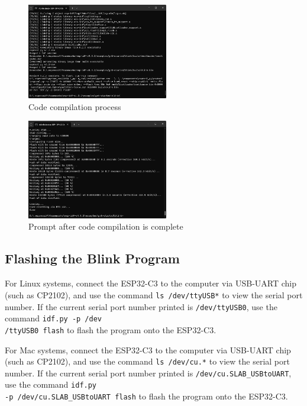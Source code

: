 \documentclass[a4paper,12pt,openany]{book}
\begin{document}
\begin{figure}[h!]
    \Centering
    \includegraphics[width=0.55\textwidth]{D4Z/4-20}
    \caption{Code compilation process}
    \label{Code compilation process}
\end{figure}

\begin{figure}[h!]
    \Centering
    \includegraphics[width=0.55\textwidth]{D4Z/4-21}
    \caption{Prompt after code compilation is complete}
    \label{Prompt after code compilation is complete}
\end{figure}

\subsection{Flashing the Blink Program}
For Linux systems, connect the ESP32-C3 to the computer via USB-UART chip (such as CP2102), and use the command \verb|ls /dev/ttyUSB*| to view the serial port number. If the current serial port number printed is \verb|/dev/ttyUSB0|, use the command \verb|idf.py -p /dev|\\ \verb|/ttyUSB0 flash| to flash the program onto the ESP32-C3.

For Mac systems, connect the ESP32-C3 to the computer via USB-UART chip (such as CP2102), and use the command \verb|ls /dev/cu.*| to view the serial port number. If the current serial port number printed is \verb|/dev/cu.SLAB_USBtoUART|, use the command \verb|idf.py |\\ \verb|-p /dev/cu.SLAB_USBtoUART flash| to flash the program onto the ESP32-C3.
\end{document}
